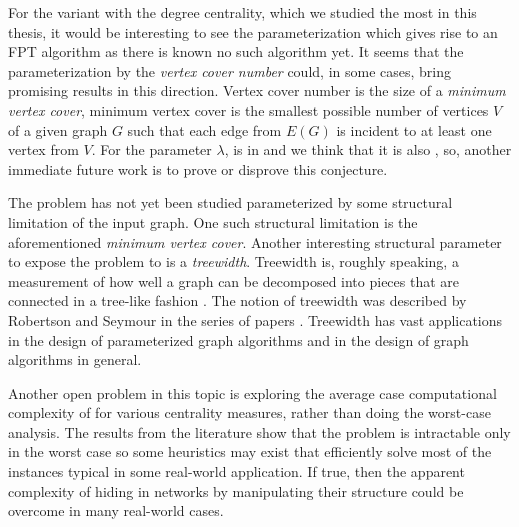 For the variant with the degree centrality, which we studied the most in this thesis,
it would be interesting to see the parameterization which gives rise to an FPT algorithm
as there is known no such algorithm yet.
It seems that the parameterization by the \emph{vertex cover number} could, in some cases,
bring promising results in this direction.
Vertex cover number is the size of a \emph{minimum vertex cover},
minimum vertex cover is the smallest possible number of vertices $V$ of a given graph $G$ such that each edge from $E(G)$ is incident
to at least one vertex from $V$.
For the parameter $\lambda$, \HLdeg is in \XP and
we think that it is also \Wh, so, another immediate future work is to prove or disprove this conjecture.

The \HL problem has not yet been studied parameterized by some structural limitation of the input graph.
One such structural limitation is the aforementioned \emph{minimum vertex cover}.
Another interesting structural parameter to expose the problem to is a \emph{treewidth}.
Treewidth is, roughly speaking, a measurement of how well a graph can be decomposed into pieces that are connected in a
tree-like fashion \cite[p.~151]{Cygan2015}.
The notion of treewidth was described by Robertson and Seymour in the series of papers \cite{Robertson1984,Robertson1986.2,Robertson1986.5}. 
Treewidth has vast applications in the design of parameterized graph algorithms and
in the design of graph algorithms in general.

Another open problem in this topic is exploring the average case computational complexity of \HL for various centrality measures,
rather than doing the worst-case analysis.
The results from the literature show that the problem is intractable only in the worst case so
some heuristics may exist that efficiently solve most of the instances typical in some real-world application.
If true, then the apparent complexity of hiding in networks by manipulating their structure
could be overcome in many real-world cases.~\cite{Dey2019}
